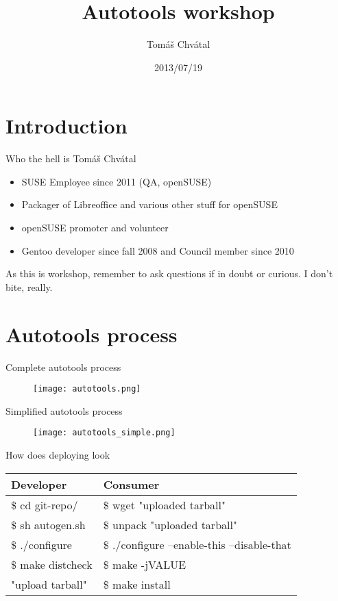 \documentclass{beamer}
\author{Tom\'{a}\v{s} Chv\'{a}tal\newline {\small openSUSE Team}}
\title{Autotools workshop}
\date{2013/07/19}
\begin{document}
\begin{frame}[t,plain]
\titlepage
\end{frame}

\section{Introduction}

\begin{frame}[t]{Who the hell is Tomáš Chvátal}
	\begin{itemize}
	\item SUSE Employee since 2011 (QA, openSUSE)
	\item Packager of Libreoffice and various other stuff for openSUSE
	\item openSUSE promoter and volunteer
	\item Gentoo developer since fall 2008 and Council member since 2010
	\end{itemize}
	\begin{center}As this is workshop, remember to ask questions if in doubt or curious. I don't bite, really.\end{center}
\end{frame}

\section{Autotools process}

\begin{frame}{Complete autotools process}
	\begin{figure}
	\texttt{[image: autotools.png]}
	\end{figure}
\end{frame}

\begin{frame}{Simplified autotools process}
	\begin{figure}
	\texttt{[image: autotools\_simple.png]}
	\end{figure}
\end{frame}

\begin{frame}{How does deploying look}
	\begin{tabular}{|l|l|}
	\toprule
	Developer & Consumer \\
	\midrule
	\$ cd git-repo/ & \$ wget "uploaded tarball" \\
	\$ sh autogen.sh & \$ unpack "uploaded tarball" \\
	\$ ./configure & \$ ./configure --enable-this --disable-that \\
	\$ make distcheck & \$ make -jVALUE \\
	"upload tarball" & \$ make install \\
	\bottomrule
	\end{tabular}
\end{frame}
\end{document}
